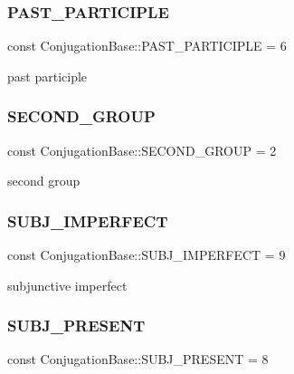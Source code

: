 \subsubsection{\texorpdfstring{P\+A\+S\+T\+\_\+\+P\+A\+R\+T\+I\+C\+I\+P\+LE}{PAST\_PARTICIPLE}}
{\footnotesize\ttfamily const Conjugation\+Base\+::\+P\+A\+S\+T\+\_\+\+P\+A\+R\+T\+I\+C\+I\+P\+LE = 6}

past participle \hypertarget{classConjugationBase_aed0c839ab301efe958079fac4bc96811}{}\label{classConjugationBase_aed0c839ab301efe958079fac4bc96811} 
\subsubsection{\texorpdfstring{S\+E\+C\+O\+N\+D\+\_\+\+G\+R\+O\+UP}{SECOND\_GROUP}}
{\footnotesize\ttfamily const Conjugation\+Base\+::\+S\+E\+C\+O\+N\+D\+\_\+\+G\+R\+O\+UP = 2}

second group \hypertarget{classConjugationBase_a530c57d644601e5430c7c3ffe064f705}{}\label{classConjugationBase_a530c57d644601e5430c7c3ffe064f705} 
\subsubsection{\texorpdfstring{S\+U\+B\+J\+\_\+\+I\+M\+P\+E\+R\+F\+E\+CT}{SUBJ\_IMPERFECT}}
{\footnotesize\ttfamily const Conjugation\+Base\+::\+S\+U\+B\+J\+\_\+\+I\+M\+P\+E\+R\+F\+E\+CT = 9}

subjunctive imperfect \hypertarget{classConjugationBase_a143faefe023f7f45d77ad739b8611d45}{}\label{classConjugationBase_a143faefe023f7f45d77ad739b8611d45} 
\subsubsection{\texorpdfstring{S\+U\+B\+J\+\_\+\+P\+R\+E\+S\+E\+NT}{SUBJ\_PRESENT}}
{\footnotesize\ttfamily const Conjugation\+Base\+::\+S\+U\+B\+J\+\_\+\+P\+R\+E\+S\+E\+NT = 8}

